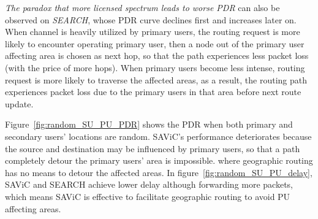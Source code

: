\textit{The paradox that more licensed spectrum leads to worse PDR} can also be observed on \textit{SEARCH}, whose PDR curve declines first and increases later on.
When channel is heavily utilized by primary users, the routing request is more likely to encounter operating primary user, then a node out of the primary user affecting area is chosen as next hop, so that the path experiences less packet loss (with the price of more hops).
When primary users become less intense, routing request is more likely to traverse the affected areas, as a result, the routing path experiences packet loss due to the primary users in that area before next route update. 

Figure~\ref{fig:random_SU_PU_PDR} shows the PDR when both primary and secondary users' locations are random.
SAViC's performance deteriorates because the source and destination may be influenced by primary users, so that a path completely detour the primary users' area is impossible. where geographic routing has no means to detour the affected areas.
In figure~\ref{fig:random_SU_PU_delay}, SAViC and SEARCH achieve lower delay although forwarding more packets, which means SAViC is effective to facilitate geographic routing to avoid PU affecting areas.




